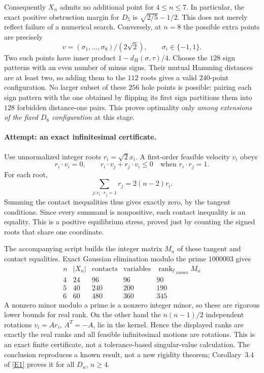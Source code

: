 \documentclass[11pt,a4paper]{article}
\newcommand{\F}{\mathbb{F}}
\newcommand{\eref}[2]{\hyperlink{extra:#1:#2}{[E#2]}}
\numberwithin{equation}{section}
\begin{document}
Consequently $X_n$ admits no additional point for $4\leq n\leq7$.
In particular, the exact positive obstruction margin for $D_5$ is
$\sqrt{2/5}-1/2$. This does not merely reflect failure of a numerical
search. Conversely, at $n=8$ the possible extra points are precisely
\[
 v=(\sigma_1,\ldots,\sigma_8)/(2\sqrt2),
 \qquad \sigma_i\in\{-1,1\}.
\]
Two such points have inner product $1-d_H(\sigma,\tau)/4$.
Choose the $128$ sign patterns with an even number of minus signs.
Their mutual Hamming distances are at least two, so adding them to the
$112$ roots gives a valid $240$-point configuration. No larger subset of
these $256$ hole points is possible: pairing each sign pattern with the
one obtained by flipping its first sign partitions them into $128$
forbidden distance-one pairs. This proves optimality only \emph{among
extensions of the fixed $D_8$ configuration} at this stage.

\paragraph{Attempt: an exact infinitesimal certificate.}
Use unnormalized integer roots $r_i=\sqrt2x_i$. A first-order feasible
velocity $v_i$ obeys
\[
 r_i\cdot v_i=0,\qquad
 r_i\cdot v_j+r_j\cdot v_i\leq0
             \quad\text{when }r_i\cdot r_j=1.
\]
For each root,
\[
 \sum_{j:r_i\cdot r_j=1}r_j=2(n-2)r_i.
\]
Summing the contact inequalities thus gives exactly zero, by the tangent
conditions. Since every summand is nonpositive, each contact inequality
is an equality. This is a positive equilibrium stress, proved just by
counting the signed roots that share one coordinate.

The accompanying script builds the integer matrix $M_n$ of these tangent
and contact equalities. Exact Gaussian elimination modulo the prime
$1000003$ gives
\[
 \begin{array}{c|r|r|r|r}
 n&|X_n|&\text{contacts}&\text{variables}&\operatorname{rank}_{\F_{1000003}}M_n\\\hline
 4&24&96&96&90\\
 5&40&240&200&190\\
 6&60&480&360&345
 \end{array}
\]
A nonzero minor modulo a prime is a nonzero integer minor, so these are
rigorous lower bounds for real rank. On the other hand the
$n(n-1)/2$ independent rotations $v_i=Ar_i$, $A^T=-A$, lie in the
kernel. Hence the displayed ranks are exactly the real ranks and all
feasible infinitesimal motions are rotations. This is an exact finite
certificate, not a tolerance-based singular-value calculation. The
conclusion reproduces a known result, not a new rigidity theorem;
Corollary~3.4 of \eref{1369}{1} proves it for all $D_n$, $n\geq4$.
\end{document}
